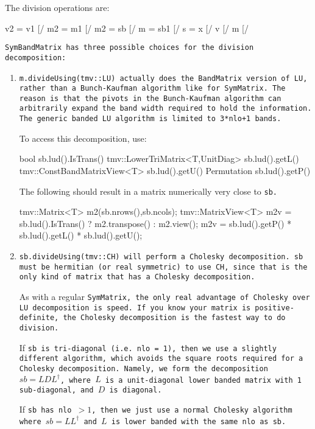 The division operations are:
\begin{tmvcode}
v2 = v1 [/%
m2 = m1 [/%
m2 = sb [/%
m = sb1 [/%
s = x [/%
v [/%
m [/%
\end{tmvcode}
\tt{SymBandMatrix} has three possible choices for the division decomposition:
\begin{enumerate}
\item
\tt{m.divideUsing(tmv::LU)} actually does the \tt{BandMatrix} version of 
LU, rather than a Bunch-Kaufman algorithm like for \tt{SymMatrix}.  The
reason is that the pivots in the Bunch-Kaufman algorithm can arbitrarily
expand the band width required to hold the information.  The generic
banded LU algorithm is limited to 3*\tt{nlo}+1 bands.

To access this decomposition, use:
\begin{tmvcode}
bool sb.lud().IsTrans()
tmv::LowerTriMatrix<T,UnitDiag> sb.lud().getL()
tmv::ConstBandMatrixView<T> sb.lud().getU()
Permutation sb.lud().getP()
\end{tmvcode}
The following should result in a matrix numerically very close to \tt{sb}.
\begin{tmvcode}
tmv::Matrix<T> m2(sb.nrows(),sb.ncols);
tmv::MatrixView<T> m2v = 
      sb.lud().IsTrans() ? m2.transpose() : m2.view();
m2v = sb.lud().getP() * sb.lud().getL() * sb.lud().getU();
\end{tmvcode}

\item
\tt{sb.divideUsing(tmv::CH)} will perform a Cholesky decomposition.  
\tt{sb} must be hermitian (or real symmetric) to use \tt{CH}, since that is the
only kind of matrix that has a Cholesky decomposition.  

As with a regular \tt{SymMatrix},
the only real advantage of Cholesky over LU decomposition is speed.  If you know your 
matrix is positive-definite, the Cholesky decomposition is the fastest way to 
do division.

If \tt{sb} is tri-diagonal (i.e. \tt{nlo} = 1), then we use a slightly 
different algorithm, which avoids the square roots required for a
Cholesky decomposition.  
Namely, we form the decomposition $sb = LDL^\dagger$, where $L$ is a
unit-diagonal lower banded matrix with 1 sub-diagonal, and $D$ is diagonal.

If \tt{sb} has \tt{nlo} $> 1$, then we just use a normal Cholesky algorithm
where $sb = LL^\dagger$ and $L$ is lower banded with the same \tt{nlo} as
\tt{sb}.


\end{enumerate}
